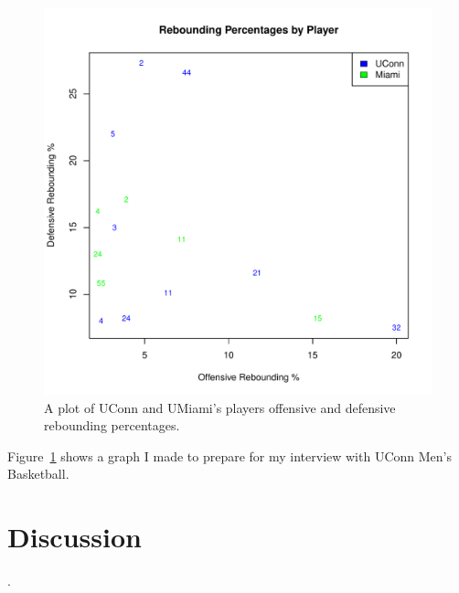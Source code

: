 \documentclass[12pt]{article}
\begin{document}
\begin{figure}[tbp]
	\centering
	\includegraphics[width=\textwidth]{graph}
	\caption{A plot of UConn and UMiami's players offensive and defensive rebounding percentages.}
	\label{fig:graph}
\end{figure}

Figure~\ref{fig:graph} shows a graph I made to prepare for my interview with UConn Men's Basketball.


\section{Discussion}
\label{sec:discussion}

\lipsum[1-4].




\end{document}
